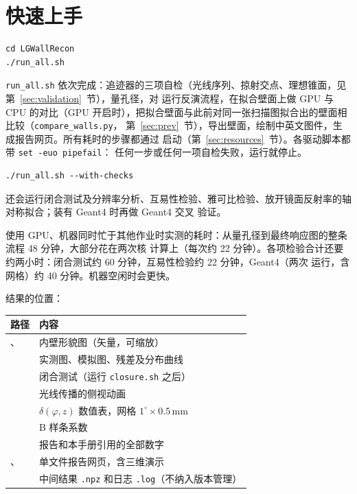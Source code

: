 \documentclass[11pt,a4paper,fontset=fandol]{ctexart}
\newcommand{\code}[1]{\texttt{#1}}
\begin{document}
\section{快速上手}

\begin{lstlisting}
cd LGWallRecon
./run_all.sh
\end{lstlisting}

\code{run\_all.sh} 依次完成：追迹器的三项自检（光线序列、掠射交点、理想锥面，见
第~\ref{sec:validation}~节），量孔径，对  运行反演流程，在拟合壁面上做 GPU
与 CPU 的对比（GPU 开启时），把拟合壁面与此前对同一张扫描图拟合出的壁面相比较（\code{compare\_walls.py}，
第~\ref{sec:prev}~节），导出壁面，绘制中英文图件，生成报告网页。所有耗时的步骤都通过
 启动（第~\ref{sec:resources}~节）。各驱动脚本都带 \code{set -euo pipefail}：
任何一步或任何一项自检失败，运行就停止。
\begin{lstlisting}
./run_all.sh --with-checks
\end{lstlisting}
还会运行闭合测试及分辨率分析、互易性检验、雅可比检验、放开镜面反射率的轴对称拟合；装有 Geant4 时再做 Geant4 交叉
验证。

使用 GPU、机器同时忙于其他作业时实测的耗时：从量孔径到最终响应图的整条流程 48 分钟，大部分花在两次核
计算上（每次约 22 分钟）。各项检验合计还要约两小时：闭合测试约 60 分钟，互易性检验约 22 分钟，Geant4（两次
运行，含网格）约 40 分钟。机器空闲时会更快。

结果的位置：

\begin{tabularx}{\textwidth}{@{}L{5.6cm}Y@{}}
\toprule
路径 & 内容 \\
\midrule
{}、 & 内壁形貌图（矢量，可缩放） \\
 & 实测图、模拟图、残差及分布曲线 \\
 & 闭合测试（运行 \code{closure.sh} 之后） \\
 & 光线传播的侧视动画 \\
 & $\delta(\varphi,z)$ 数值表，网格 $1^\circ\times0.5$\,mm \\
 & B 样条系数 \\
 & 报告和本手册引用的全部数字 \\
、 & 单文件报告网页，含三维演示 \\
 & 中间结果 \code{.npz} 和日志 \code{.log}（不纳入版本管理） \\
\bottomrule
\end{tabularx}
\end{document}
